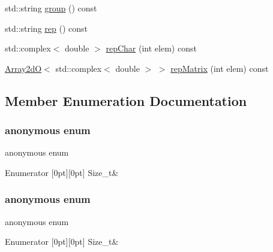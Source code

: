 \begin{DoxyCompactItemize}
std\+::string \mbox{\hyperlink{structHadron_1_1C4nnmERep_a45a936a694de501cfdb433b97302755a}{group}} () const
\item 
std\+::string \mbox{\hyperlink{structHadron_1_1C4nnmERep_af7b1046412f5b815c19810b47eb8686d}{rep}} () const
\item 
std\+::complex$<$ double $>$ \mbox{\hyperlink{structHadron_1_1C4nnmERep_af3cb7f743630f5a14e38a10ee61dc9ff}{rep\+Char}} (int elem) const
\item 
\mbox{\hyperlink{classADAT_1_1Array2dO}{Array2dO}}$<$ std\+::complex$<$ double $>$ $>$ \mbox{\hyperlink{structHadron_1_1C4nnmERep_adb5804895fb825dd5a5fde9c417e5cb8}{rep\+Matrix}} (int elem) const
\end{DoxyCompactItemize}


\subsection{Member Enumeration Documentation}
\mbox{\label{structHadron_1_1C4nnmERep_aa8063fc12912095d0a8b3a0403d3f175}} 
\subsubsection{\texorpdfstring{anonymous enum}{anonymous enum}}
{\footnotesize\ttfamily anonymous enum}

\begin{DoxyEnumFields}{Enumerator}
[0pt][0pt]{}\mbox{\label{structHadron_1_1C4nnmERep_abd85b76d6704b9a219d18f9b13e0c525acad081a8a6c1ab83493a6d3b86d67f7e}} 
Size\+\_\+t&\\
\hline

\end{DoxyEnumFields}
\mbox{\label{structHadron_1_1C4nnmERep_a22d87e618b837bacea4df513292a1053}} 
\subsubsection{\texorpdfstring{anonymous enum}{anonymous enum}}
{\footnotesize\ttfamily anonymous enum}

\begin{DoxyEnumFields}{Enumerator}
[0pt][0pt]{}\mbox{\label{structHadron_1_1C4nnmERep_abd85b76d6704b9a219d18f9b13e0c525acad081a8a6c1ab83493a6d3b86d67f7e}} 
Size\+\_\+t&\\
\hline

\end{DoxyEnumFields}
\mbox{\label{structHadron_1_1C4nnmERep_abd85b76d6704b9a219d18f9b13e0c525}} 
